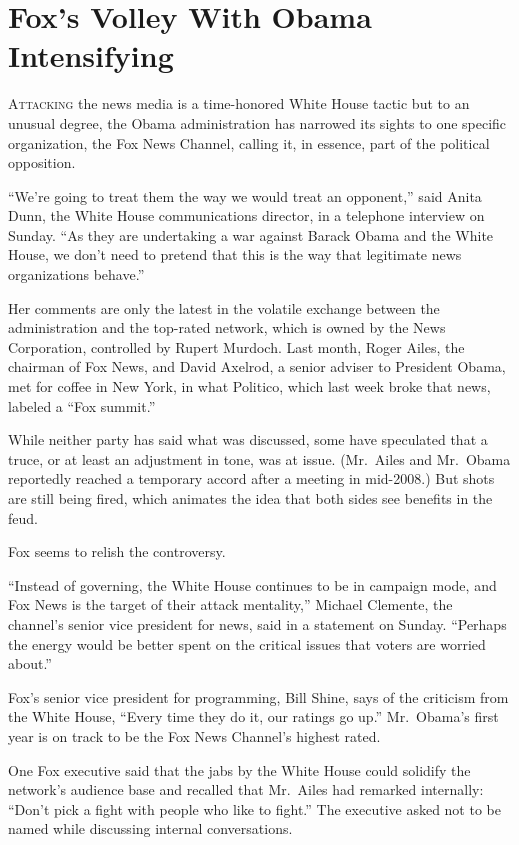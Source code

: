 ﻿\documentclass[12pt]{article}
\begin{document}
\section{Fox's Volley\cite{volley} With Obama Intensifying}

\lettrine{A}{ttacking} the news media is a time-honored White House tactic
but to an unusual degree, the Obama administration has narrowed its sights to one specific
organization, the Fox News Channel, calling it, in essence, part of the political opposition.

``We're going to treat them the way we would treat an opponent,'' said Anita Dunn, the White House
communications director, in a telephone interview on Sunday. ``As they are undertaking a war against
Barack Obama and the White House, we don't need to pretend that this is the way that legitimate news
organizations behave.''

Her comments are only the latest in the volatile exchange between the administration and the
top-rated network, which is owned by the News Corporation, controlled by Rupert Murdoch. Last month,
Roger Ailes, the chairman of Fox News, and David Axelrod, a senior adviser to President Obama, met
for coffee in New York, in what Politico, which last week broke that news, labeled a ``Fox summit.''

While neither party has said what was discussed, some have speculated that a truce, or at least an
adjustment in tone, was at issue. (Mr.~Ailes and Mr.~Obama reportedly reached a temporary accord
after a meeting in mid-2008.) But shots are still being fired, which animates the idea that both
sides see benefits in the feud.

Fox seems to relish\cite{relish} the controversy.

``Instead of governing, the White House continues to be in campaign mode, and Fox News is the target
of their attack mentality,'' Michael Clemente, the channel's senior vice president for news, said in
a statement on Sunday. ``Perhaps the energy would be better spent on the critical issues that voters
are worried about.''

Fox's senior vice president for programming, Bill Shine, says of the criticism from the White House,
``Every time they do it, our ratings go up.'' Mr.~Obama's first year is on track to be the Fox News
Channel's highest rated.

One Fox executive said that the jabs by the White House could solidify the network's audience base
and recalled that Mr.~Ailes had remarked internally: ``Don't pick a fight with people who like to
fight.'' The executive asked not to be named while discussing internal conversations.
\end{document}
